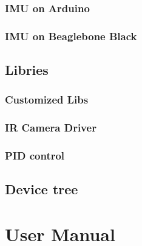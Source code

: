\begin{appendices}
            \subsubsection{IMU on Arduino}
                
            \subsubsection{IMU on Beaglebone Black}
                
                

        \subsection{Libries}
            \label{source:libs}
            \subsubsection{Customized Libs}
                
                
                
            \subsubsection{IR Camera Driver}
                
                
                
                
                
                
                
            \subsubsection{PID control}
                
        \subsection{Device tree}
            \label{source:overlays}
            
            
            
    \section{User Manual}
\end{appendices}


